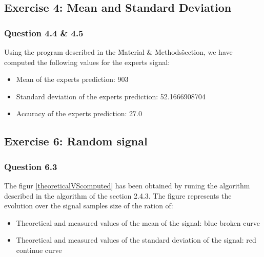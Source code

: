 \documentclass[a4paper,10pt]{article}
\begin{document}
    \subsection{Exercise 4: Mean and Standard Deviation }
	\subsubsection{Question 4.4 \& 4.5}
	Using the program described in the \"Material \& Methods\" section, we have computed the following values for the experts signal:
	\begin{itemize}
	\item Mean of the experts prediction: 903
	\item Standard deviation of the experts prediction: 52.1666908704
	\item Accuracy of the experts prediction: 27.0
	\end{itemize}
	
	
    \subsection{Exercise 6: Random signal}
    \subsubsection{Question 6.3 }
	The figur \ref{theoreticalVScomputed} has been obtained by runing the algorithm described in the algorithm of the section 2.4.3.\newline
	The figure represents the evolution over the signal samples size of the ration of:
	\begin{itemize}
	 \item Theoretical and measured values of the mean of the signal: blue broken  curve
	 \item Theoretical and measured values of the standard deviation of the signal: red continue curve
	\end{itemize}
\end{document}
